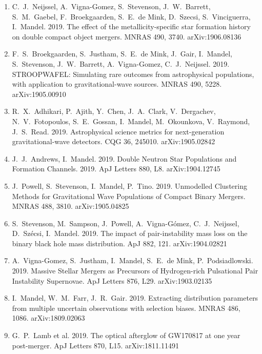 \documentclass[margin,line]{res}
\begin{document}
\begin{resume}
\begin{enumerate}
\item C.~J.~Neijssel, A.~Vigna-Gomez, S.~Stevenson, J.~W.~Barrett, S.~M.~Gaebel, F.~Broekgaarden, S.~E.~de Mink, D.~Szecsi, S.~Vinciguerra, I.~Mandel.  2019. The effect of the metallicity-specific star formation history on double compact object mergers.  MNRAS 490, 3740.  arXiv:1906.08136

\item F.~S.~Broekgaarden, S.~Justham, S.~E.~de Mink, J.~Gair, I.~Mandel, S.~Stevenson, J.~W.~Barrett, A.~Vigna-Gomez, C.~J.~Neijssel.  2019. STROOPWAFEL: Simulating rare outcomes from astrophysical populations, with application to gravitational-wave sources.  MNRAS 490, 5228.  arXiv:1905.00910

\item R.~X.~Adhikari, P.~Ajith, Y.~Chen, J.~A.~Clark, V.~Dergachev, N.~V.~Fotopoulos, S.~E.~Gossan, I.~Mandel, M.~Okounkova, V.~Raymond, J.~S.~Read.  2019. Astrophysical science metrics for next-generation gravitational-wave detectors.  CQG 36, 245010.  arXiv:1905.02842

\item J.~J.~Andrews, I.~Mandel. 2019. Double Neutron Star Populations and Formation Channels.   2019.  ApJ Letters 880, L8.  arXiv:1904.12745

\item J.~Powell, S.~Stevenson, I.~Mandel, P.~Tino.  2019.  Unmodelled Clustering Methods for Gravitational Wave Populations of Compact Binary Mergers.  MNRAS 488, 3810. arXiv:1905.04825

\item S.~Stevenson, M.~Sampson, J.~Powell, A.~Vigna-G\'{o}mez, C.~J.~Neijssel, D.~Sz\'{e}csi, I.~Mandel.  2019. The impact of pair-instability mass loss on the binary black hole mass distribution.   ApJ 882, 121.  arXiv:1904.02821 

\item A.~Vigna-Gomez, S.~Justham, I.~Mandel, S.~E.~de Mink, P.~Podsiadlowski.  2019.  Massive Stellar Mergers as Precursors of Hydrogen-rich Pulsational Pair Instability Supernovae.  ApJ Letters 876, L29. arXiv:1903.02135

\item I.~Mandel, W.~M.~Farr, J.~R.~Gair.  2019. Extracting distribution parameters from multiple uncertain observations with selection biases.  MNRAS 486, 1086.  arXiv:1809.02063

\item G.~P.~Lamb et al. 2019. The optical afterglow of GW170817 at one year post-merger.  ApJ Letters 870, L15. arXiv:1811.11491


\end{enumerate}
\end{resume}
\end{document}
